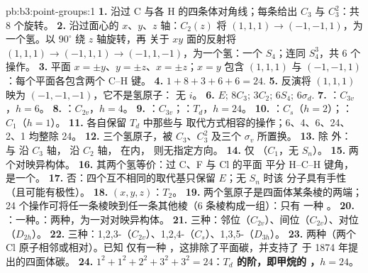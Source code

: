 \begin{solution}{pb:b3:point-groups:1}
\textbf{1.} 沿过 C 与各 H 的四条体对角线；每条给出
$C_3$ 与 $C_3^2$：共 8 个旋转。
\textbf{2.} 沿过面心的 $x$、$y$、$z$ 轴：$C_2(z)$ 将 $(1,1,1)
\to (-1,-1,1)$，为一个氢。以 $90^\circ$ 绕 $z$ 轴旋转，再
关于 $xy$ 面的反射将 $(1,1,1) \to (-1,1,1) \to (-1,1,-1)$，为一个氢：一个
$S_4$；连同 $S_4^3$，共 6 个操作。
\textbf{3.} 平面 $x = \pm y$、$y = \pm z$、$x = \pm z$；$x = y$ 包含
$(1,1,1)$ 与 $(-1,-1,1)$：每个平面各包含两个 C--H 键。
\textbf{4.} $1 + 8 + 3 + 6 + 6 = 24$.
\textbf{5.} 反演将 $(1,1,1)$ 映为 $(-1,-1,-1)$，它不是氢原子：
无 $i$。
\textbf{6.} $E$; $8C_3$; $3C_2$; $6S_4$; $6\sigma_d$.
\textbf{7.} ：$C_{3v}$，$h = 6$。
\textbf{8.} ：$C_{2v}$，$h = 4$。
\textbf{9.} ：$C_{3v}$；：$T_d$，$h = 24$。
\textbf{10.} ：$C_s$（$h = 2$）；：$C_1$（$h = 1$）。
\textbf{11.} 各自保留 $T_d$ 中那些与
取代方式相容的操作；6、4、6、24、2、1 均整除 24。
\textbf{12.} 三个氢原子，被 $C_3$、$C_3^2$ 及三个
$\sigma_v$ 所置换。
\textbf{13.} 除  外： 与  沿 $C_3$ 轴，
 沿 $C_2$ 轴， 在内，
 则无指定方向。
\textbf{14.} 仅 （$C_1$，无 $S_n$）。
\textbf{15.} 两个对映异构体。
\textbf{16.} 其两个氢等价：过 C、F 与 Cl 的平面
平分 H--C--H 键角，是一个。
\textbf{17.} 否：四个互不相同的取代基只保留 $E$；无 $S_n$ 时该
分子具有手性（且可能有极性）。
\textbf{18.} $(x, y, z)$：$T_2$。
\textbf{19.} 两个氢原子是四面体某条棱的两端；24
个操作可将任一条棱映到任一条其他棱（6 条棱构成一组）：只有
一种 。
\textbf{20.} ：一种。：两种，为一对对映异构体。
\textbf{21.} 三种：邻位（$C_{2v}$）、间位（$C_{2v}$）、对位（$D_{2h}$）。
\textbf{22.} 三种：1,2,3-（$C_{2v}$）、1,2,4-（$C_s$）、1,3,5-（$D_{3h}$）。
\textbf{23.} 两种（两个 Cl 原子相邻或相对）。已知
仅有一种 ，这排除了平面碳，并支持了
于 1874 年提出的四面体碳。
\textbf{24.} $1^2 + 1^2 + 2^2 + 3^2 + 3^2 = 24$：\textbf{$T_d$ 的阶，即甲烷的
，$h = 24$}。
\end{solution}
